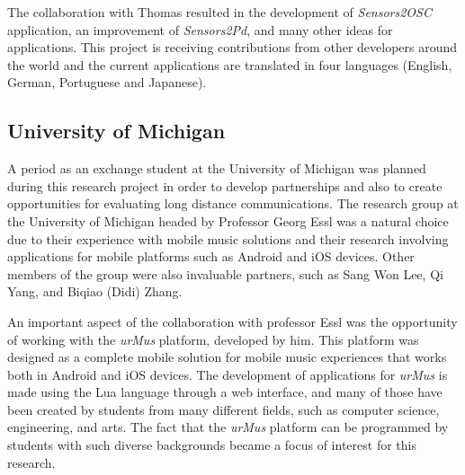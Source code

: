 The collaboration with Thomas resulted in the development of \textit{Sensors2OSC} application, an improvement of \textit{Sensors2Pd}, and many other ideas for applications.
This project is receiving contributions from other developers around the world and the current applications are translated in four languages (English, German, Portuguese and Japanese).

\subsection*{University of Michigan}


A period as an exchange student at the University of Michigan was planned during this research project in order to develop partnerships and also to create opportunities for evaluating long distance communications.
The research group at the University of Michigan headed by Professor Georg Essl was a natural choice due to their experience with mobile music solutions and their research involving applications for mobile platforms such as Android and iOS devices.
Other members of the group were also invaluable partners, such as Sang Won Lee, Qi Yang, and Biqiao (Didi) Zhang.

An important aspect of the collaboration with professor Essl was the opportunity of working with the \textit{urMus} platform, developed by him.
This platform was designed as a complete mobile solution for mobile music experiences that works both in Android and iOS devices.
The development of applications for \textit{urMus} is made using the Lua language through a web interface, and many of those have been created by students from many different fields, such as computer science, engineering, and arts. The fact that the \textit{urMus} platform can be programmed by students with such diverse backgrounds became a focus of interest for this research. 
%

